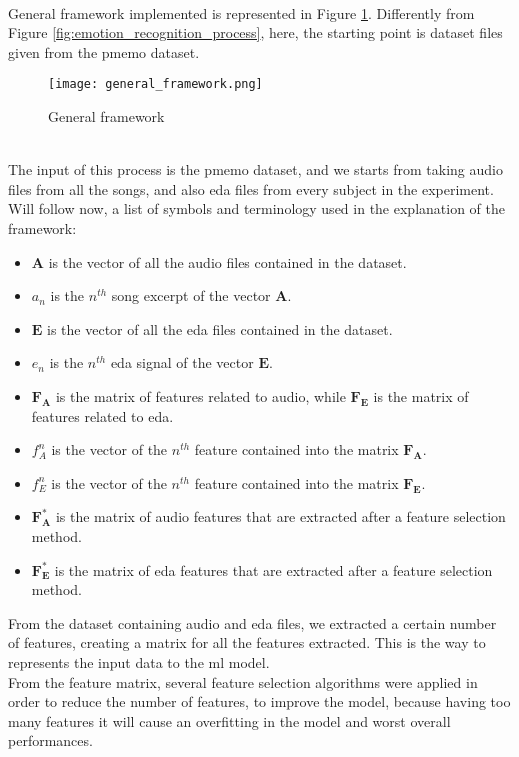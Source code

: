 \\
General framework implemented is represented in Figure \ref{fig:general_framework}. Differently from Figure \ref{fig:emotion_recognition_process}, here, the starting point is dataset files given from the \gls{pmemo} dataset.
\begin{figure}[h]
    \centering
    \texttt{[image: general\_framework.png]} 
	\caption{General framework}
    \label{fig:general_framework}
\end{figure}
\\
The input of this process is the \gls{pmemo} dataset, and we starts from taking audio files from all the songs, and also \gls{eda} files from every subject in the experiment.
\\
Will follow now, a list of symbols and terminology used in the explanation of the framework:
\begin{itemize}
	\item $\textbf{A}$ is the vector of all the audio files contained in the dataset.
	\item $a_n$ is the $n^{th}$ song excerpt of the vector $\textbf{A}$.
	\item $\textbf{E}$ is the vector of all the \gls{eda} files contained in the dataset.
	\item $e_n$ is the $n^{th}$ \gls{eda} signal of the vector $\textbf{E}$.
	\item $\textbf{F}_\textbf{A}$ is the matrix of features related to audio, while $\textbf{F}_\textbf{E}$ is the matrix of features related to \gls{eda}.
	\item $f_A^n$ is the vector of the $n^{th}$ feature contained into the matrix $\textbf{F}_\textbf{A}$.
	\item $f_E^n$ is the vector of the $n^{th}$ feature contained into the matrix $\textbf{F}_\textbf{E}$.
	\item $\textbf{F}_\textbf{A}^*$ is the matrix of audio features that are extracted after a feature selection method.
	\item $\textbf{F}_\textbf{E}^*$ is the matrix of \gls{eda} features that are extracted after a feature selection method.
\end{itemize}
From the dataset containing audio and \gls{eda} files, we extracted a certain number of features, creating a matrix for all the features extracted. This is the way to represents the input data to the \gls{ml} model.
\\
From the feature matrix, several feature selection algorithms were applied in order to reduce the number of features, to improve the model, because having too many features it will cause an overfitting in the model and worst overall performances.

